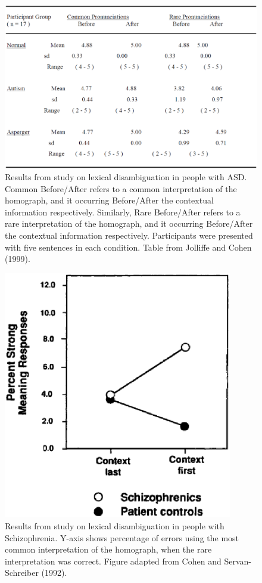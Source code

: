 \begin{figure}[tp]
\begin{center}
	\includegraphics[width=115mm]{figures/asd_lexamb_study_results.eps}
\end{center}
\caption{Results from study on lexical disambiguation in people with ASD.  Common Before/After refers to a common interpretation of the homograph, and it occurring Before/After the contextual information respectively.  Similarly, Rare Before/After refers to a rare interpretation of the homograph, and it occurring Before/After the contextual information respectively. Participants were presented with five sentences in each condition.  Table from Jolliffe and Cohen (1999).}
\label{asd-lexamb-study}
\end{figure} 

\begin{figure}[tp]
\begin{center}
	\includegraphics[width=100mm]{figures/schiz_lexamb_study_results.eps}
\end{center}
\caption{Results from study on lexical disambiguation in people with Schizophrenia.  Y-axis shows percentage of errors using the most common interpretation of the homograph, when the rare interpretation was correct.  Figure adapted from Cohen and Servan-Schreiber (1992).}
\label{schiz-lexamb-study}
\end{figure} 

